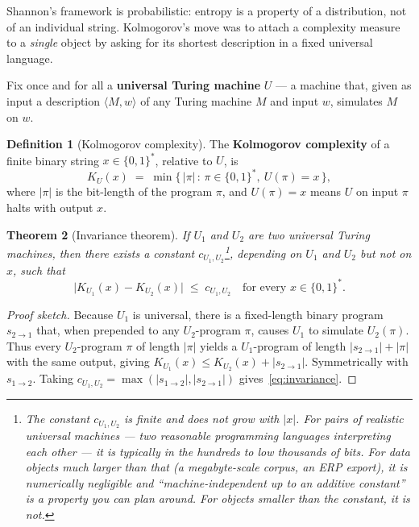 \documentclass[12pt,a4paper]{article}
\theoremstyle{plain}
\newtheorem{theorem}{Theorem}[section]
\theoremstyle{definition}
\newtheorem{definition}[theorem]{Definition}
\begin{document}
Shannon's framework is probabilistic: entropy is a property of a
distribution, not of an individual string.  Kolmogorov's move
\citep{kolmogorov1965three} was to attach a complexity measure to a
\emph{single} object by asking for its shortest description in a fixed
universal language.

Fix once and for all a \textbf{universal Turing machine} $U$ --- a
machine that, given as input a description $\langle M, w\rangle$ of
any Turing machine $M$ and input $w$, simulates $M$ on $w$.

\begin{definition}[Kolmogorov complexity]
\label{def:kolmogorov}
The \textbf{Kolmogorov complexity} of a finite binary string
$x \in \{0,1\}^*$, relative to $U$, is
\begin{equation}
  K_U(x)
  \;=\; \min\bigl\{\, |\pi| \,:\, \pi \in \{0,1\}^*,\ U(\pi) = x \,\bigr\},
  \label{eq:kolmogorov}
\end{equation}
where $|\pi|$ is the bit-length of the program $\pi$, and $U(\pi) = x$
means $U$ on input $\pi$ halts with output $x$.
\end{definition}

\begin{theorem}[Invariance theorem]
\label{thm:invariance}
If $U_1$ and $U_2$ are two universal Turing machines, then there
exists a constant $c_{U_1,U_2}$\footnote{The constant $c_{U_1,U_2}$
is finite and does not grow with $|x|$.  For pairs of realistic
universal machines --- two reasonable programming languages
interpreting each other --- it is typically in the hundreds to low
thousands of bits.  For data objects much larger than that (a
megabyte-scale corpus, an ERP export), it is numerically negligible
and ``machine-independent up to an additive constant'' is a property
you can plan around.  For objects smaller than the constant, it is
not.}, depending on $U_1$ and $U_2$ but not on $x$, such that
\begin{equation}
  \bigl| K_{U_1}(x) - K_{U_2}(x) \bigr| \;\le\; c_{U_1,U_2}
  \quad \text{for every } x \in \{0,1\}^*.
  \label{eq:invariance}
\end{equation}
\end{theorem}

\begin{proof}[Proof sketch]
Because $U_1$ is universal, there is a fixed-length binary program
$s_{2\to 1}$ that, when prepended to any $U_2$-program $\pi$, causes
$U_1$ to simulate $U_2(\pi)$.  Thus every $U_2$-program $\pi$ of
length $|\pi|$ yields a $U_1$-program of length
$|s_{2\to 1}| + |\pi|$ with the same output, giving $K_{U_1}(x) \le
K_{U_2}(x) + |s_{2\to 1}|$.  Symmetrically with $s_{1\to 2}$.  Taking
$c_{U_1,U_2} = \max(|s_{1\to 2}|, |s_{2\to 1}|)$
gives~\eqref{eq:invariance}.
\end{proof}
\end{document}

